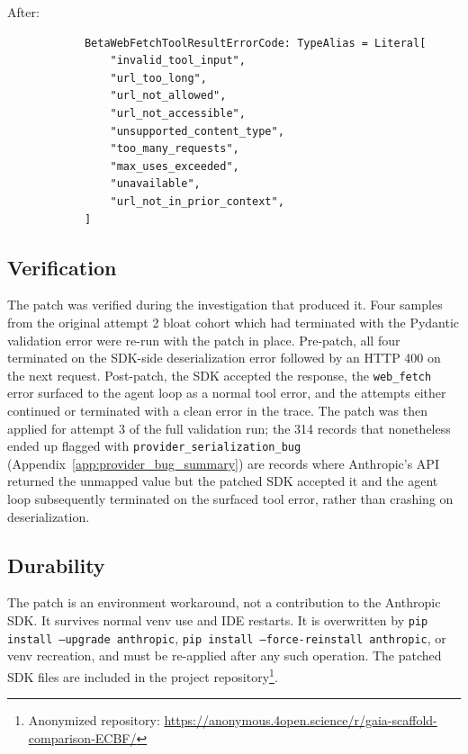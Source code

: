 \documentclass[10pt]{article} %
\begin{document}
            After:
            \begin{verbatim}
            BetaWebFetchToolResultErrorCode: TypeAlias = Literal[
                "invalid_tool_input",
                "url_too_long",
                "url_not_allowed",
                "url_not_accessible",
                "unsupported_content_type",
                "too_many_requests",
                "max_uses_exceeded",
                "unavailable",
                "url_not_in_prior_context",
            ]
            \end{verbatim}
        
        \subsection{Verification}
        
            The patch was verified during the investigation that produced it. Four samples from the original attempt 2 bloat cohort which had terminated with the Pydantic validation error were re-run with the patch in place. Pre-patch, all four terminated on the SDK-side deserialization error followed by an HTTP 400 on the next request. Post-patch, the SDK accepted the response, the \texttt{web\_fetch} error surfaced to the agent loop as a normal tool error, and the attempts either continued or terminated with a clean error in the trace. The patch was then applied for attempt 3 of the full validation run; the 314 records that nonetheless ended up flagged with \texttt{provider\_serialization\_bug} (Appendix~\ref{app:provider_bug_summary}) are records where Anthropic's API returned the unmapped value but the patched SDK accepted it and the agent loop subsequently terminated on the surfaced tool error, rather than crashing on deserialization.
        
        \subsection{Durability}
        
            The patch is an environment workaround, not a contribution to the Anthropic SDK. It survives normal venv use and IDE restarts. It is overwritten by \texttt{pip install --upgrade anthropic}, \texttt{pip install --force-reinstall anthropic}, or venv recreation, and must be re-applied after any such operation. The patched SDK files are included in the project repository\footnote{Anonymized repository: \url{https://anonymous.4open.science/r/gaia-scaffold-comparison-ECBF/}}.
\end{document}
